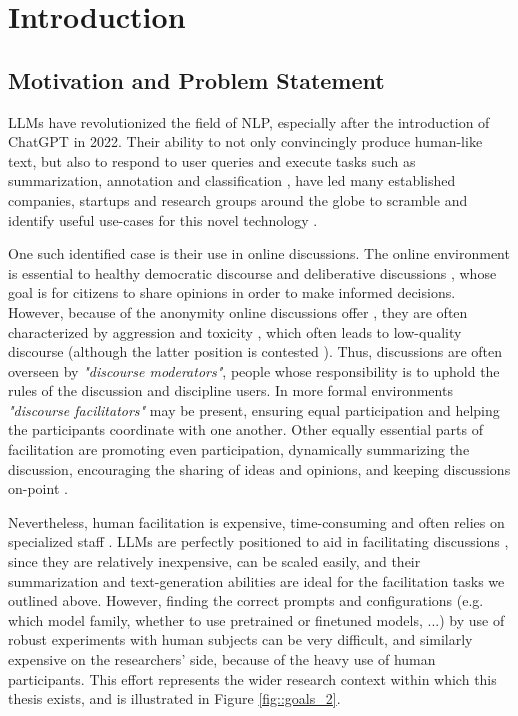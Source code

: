 %
\chapter{Introduction}
\label{sec:intro}

\section{Motivation and Problem Statement}
\label{sec:intro:motivation}

\acp{LLM} have revolutionized the field of \ac{NLP}, especially after the introduction of ChatGPT in 2022. Their ability to not only convincingly produce human-like text, but also to respond to user queries and execute tasks such as summarization, annotation and classification \cite{ts2024, tan2024largelanguagemodelsdata}, have led many established companies, startups and research groups around the globe to scramble and identify useful use-cases for this novel technology \cite{HadiASO, Zhou2024LargeLM, Hutchinson2024LLMAssistedVA}.

One such identified case is their use in online discussions. The online environment is essential to healthy democratic discourse \cite{WrightDemocracy, Janssen2005, Papacharissi2004DemocracyOC} and deliberative discussions \cite{small2021polis}, whose goal is for citizens to share opinions in order to make informed decisions. However, because of the anonymity online discussions offer \cite{Avalle2024PersistentIP}, they are often characterized by aggression and toxicity \cite{XiaToxicity}, which often leads to low-quality discourse \cite{WrightDemocracy} (although the latter position is contested \cite{Papacharissi2004DemocracyOC}). Thus, discussions are often overseen by \textit{"discourse moderators"}, people whose responsibility is to uphold the rules of the discussion and discipline users. In more formal environments \textit{"discourse facilitators"} may be present, ensuring equal participation and helping the participants coordinate with one another. Other equally essential parts of facilitation are promoting even participation, dynamically summarizing the discussion, encouraging the sharing of ideas and opinions, and keeping discussions on-point \cite{Harvard2024, Wang2008StudentfacilitatorsRI}.

Nevertheless, human facilitation is expensive, time-consuming and often relies on specialized staff \cite{small-polis-llm}. LLMs are perfectly positioned to aid in facilitating discussions \cite{small-polis-llm}, since they are relatively inexpensive, can be scaled easily, and their summarization and text-generation abilities are ideal for the facilitation tasks we outlined above. However, finding the correct prompts and configurations (e.g. which model family, whether to use pretrained or finetuned models, ...) by use of robust experiments with human subjects can be very difficult, and similarly expensive on the researchers' side, because of the heavy use of human participants. This effort represents the wider research context within which this thesis exists, and is illustrated in Figure \ref{fig::goals_2}.

